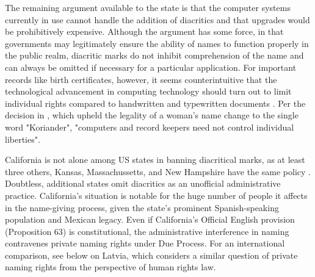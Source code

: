 The remaining argument available to the state is that the computer systems
currently in use cannot handle the addition of diacritics and that upgrades
would be prohibitively expensive. Although the argument has some force, in that
governments may legitimately ensure the ability of names to function properly
in the public realm, diacritic marks do not inhibit comprehension of the name
and can always be omitted if necessary for a particular application. For
important records like birth certificates, however, it seems counterintuitive
that the technological advancement in computing technology should turn out to
limit individual rights compared to handwritten and typewritten documents
\parencite[191]{larson11}. Per the decision in \parencite{ferner96}, which
upheld the legality of a woman's name change to the single word "Koriander",
"computers and record keepers need not control individual liberties".

California is not alone among US states in banning diacritical marks, as at
least three others, Kansas, Massachussetts, and New Hampshire have the same
policy \parencite{larson11}. Doubtless, additional states omit diacritics as an
unofficial administrative practice. California's situation is notable for the
huge number of people it affects in the name-giving process, given the state's
prominent Spanish-speaking population and Mexican legacy. Even if California's
Official English provision (Proposition 63) is constitutional, the
administrative interference in naming contravenes private naming rights under
Due Process. For an international comparison, see below on Latvia, which
considers a similar question of private naming rights from the perspective of
human rights law.
